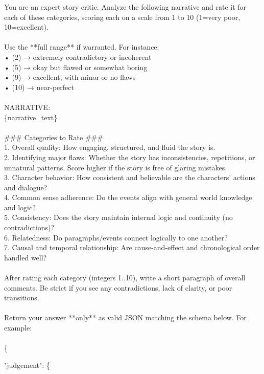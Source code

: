 \documentclass[11pt]{article}
\begin{document}
\begin{small}
\begin{tcolorbox}[colback=gray!10, colframe=gray!40, arc=4mm, boxrule=0pt]
You are an expert story critic. Analyze the following narrative and rate it for each of these categories, scoring each on a scale from 1 to 10 (1=very poor, 10=excellent). \\ 
\\
Use the **full range** if warranted. For instance:\\
 • (2) → extremely contradictory or incoherent \\
 • (5) → okay but flawed or somewhat boring\\
 • (9) → excellent, with minor or no flaws\\
 • (10) → near-perfect\\
\\
NARRATIVE:\\
\{narrative\_text\}\\
\\
### Categories to Rate ###\\
1. Overall quality: How engaging, structured, and fluid the story is.\\
2. Identifying major flaws: Whether the story has inconsistencies, repetitions, or unnatural patterns. Score higher if the story is free of glaring mistakes.\\
3. Character behavior: How consistent and believable are the characters’ actions and dialogue?\\
4. Common sense adherence: Do the events align with general world knowledge and logic?\\
5. Consistency: Does the story maintain internal logic and continuity (no contradictions)?\\
6. Relatedness: Do paragraphs/events connect logically to one another?\\
7. Causal and temporal relationship: Are cause-and-effect and chronological order handled well?\\
\\
After rating each category (integers 1..10), write a short paragraph of overall comments. Be strict if you see any contradictions, lack of clarity, or poor transitions.\\
\\
Return your answer **only** as valid JSON matching the schema below. For example:\\
\\
\{
\par\hspace{1em}"judgement": \{

\end{tcolorbox}
\end{small}
\end{document}
